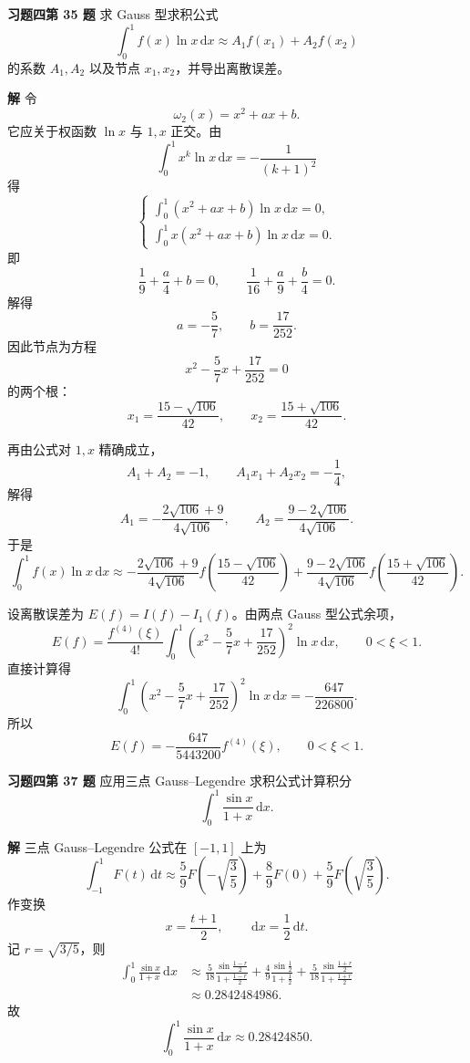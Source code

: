 \documentclass[UTF8,a4paper,11pt]{ctexart}
\newcommand{\dd}{\,\mathrm{d}}
\begin{document}
\bigskip\bigskip

\noindent\textbf{习题四\quad 第 35 题}\quad
求 Gauss 型求积公式
\[
  \int_0^1 f(x)\ln x\dd x
  \approx A_1f(x_1)+A_2f(x_2)
\]
的系数 $A_1,A_2$ 以及节点 $x_1,x_2$，并导出离散误差。

\medskip
\noindent\textbf{解}\quad
令
\[
  \omega_2(x)=x^2+ax+b.
\]
它应关于权函数 $\ln x$ 与 $1,x$ 正交。由
\[
  \int_0^1 x^k\ln x\dd x=-\frac{1}{(k+1)^2}
\]
得
\[
  \begin{cases}
  \displaystyle
  \int_0^1 (x^2+ax+b)\ln x\dd x=0,\\[2mm]
  \displaystyle
  \int_0^1 x(x^2+ax+b)\ln x\dd x=0.
  \end{cases}
\]
即
\[
  \frac19+\frac{a}{4}+b=0,\qquad
  \frac1{16}+\frac{a}{9}+\frac{b}{4}=0.
\]
解得
\[
  a=-\frac57,\qquad b=\frac{17}{252}.
\]
因此节点为方程
\[
  x^2-\frac57x+\frac{17}{252}=0
\]
的两个根：
\[
  \boxed{
  x_1=\frac{15-\sqrt{106}}{42},\qquad
  x_2=\frac{15+\sqrt{106}}{42}.}
\]

再由公式对 $1,x$ 精确成立，
\[
  A_1+A_2=-1,\qquad
  A_1x_1+A_2x_2=-\frac14,
\]
解得
\[
  \boxed{
  A_1=-\frac{2\sqrt{106}+9}{4\sqrt{106}},
  \qquad
  A_2=\frac{9-2\sqrt{106}}{4\sqrt{106}}.}
\]
于是
\[
  \boxed{
  \int_0^1 f(x)\ln x\dd x
  \approx
  -\frac{2\sqrt{106}+9}{4\sqrt{106}}
  f\!\left(\frac{15-\sqrt{106}}{42}\right)
  +\frac{9-2\sqrt{106}}{4\sqrt{106}}
  f\!\left(\frac{15+\sqrt{106}}{42}\right).}
\]

设离散误差为 $E(f)=I(f)-I_1(f)$。由两点 Gauss 型公式余项，
\[
  E(f)
  =
  \frac{f^{(4)}(\xi)}{4!}
  \int_0^1
  \left(x^2-\frac57x+\frac{17}{252}\right)^2\ln x\dd x,
  \qquad 0<\xi<1.
\]
直接计算得
\[
  \int_0^1
  \left(x^2-\frac57x+\frac{17}{252}\right)^2\ln x\dd x
  =-\frac{647}{226800}.
\]
所以
\[
  \boxed{E(f)=-\frac{647}{5443200}f^{(4)}(\xi),\qquad 0<\xi<1.}
\]

\bigskip\bigskip

\noindent\textbf{习题四\quad 第 37 题}\quad
应用三点 Gauss--Legendre 求积公式计算积分
\[
  \int_0^1\frac{\sin x}{1+x}\dd x.
\]

\medskip
\noindent\textbf{解}\quad
三点 Gauss--Legendre 公式在 $[-1,1]$ 上为
\[
  \int_{-1}^{1}F(t)\dd t
  \approx
  \frac59F\!\left(-\sqrt{\frac35}\right)
  +\frac89F(0)
  +\frac59F\!\left(\sqrt{\frac35}\right).
\]
作变换
\[
  x=\frac{t+1}{2},\qquad \dd x=\frac12\dd t.
\]
记 $r=\sqrt{3/5}$，则
\[
\begin{aligned}
  \int_0^1\frac{\sin x}{1+x}\dd x
  &\approx
  \frac{5}{18}
  \frac{\sin\frac{1-r}{2}}{1+\frac{1-r}{2}}
  +\frac49\frac{\sin\frac12}{1+\frac12}
  +\frac{5}{18}
  \frac{\sin\frac{1+r}{2}}{1+\frac{1+r}{2}}  \\
  &\approx 0.2842484986.
\end{aligned}
\]
故
\[
  \boxed{\displaystyle
  \int_0^1\frac{\sin x}{1+x}\dd x\approx 0.28424850.}
\]
\end{document}
